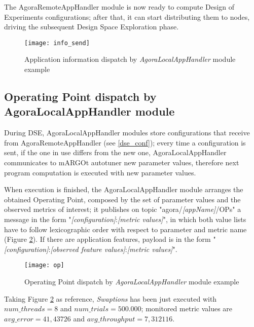 The AgoraRemoteAppHandler module is now ready to compute Design of Experiments configurations; after that, it can start distributing them to nodes, driving the subsequent Design Space Exploration phase.

\begin{figure}[t]

    \centering
    \texttt{[image: info\_send]}
    \caption{Application information dispatch by \textit{AgoraLocalAppHandler} module example}
    \label{fig:info_send}
    
\end{figure}





\subsection{Operating Point dispatch by AgoraLocalAppHandler module}\label{opSend}

During DSE, AgoraLocalAppHandler modules store configurations that receive from AgoraRemoteAppHandler (see \ref{dse_conf}); every time a configuration is sent, if the one in use differs from the new one, AgoraLocalAppHandler communicates to mARGOt autotuner new parameter values, therefore next program computation is executed with new parameter values.

When execution is finished, the AgoraLocalAppHandler module arranges the obtained Operating Point, composed by the set of parameter values and the observed metrics of interest; it publishes on topic "agora/\textit{[appName]}/OPs" a message in the form "\textit{[configuration]}:\textit{[metric values]}", in which both value lists have to follow lexicographic order with respect to parameter and metric name (Figure \ref{fig:op}). If there are application features, payload is in the form "\textit{[configuration]}:\textit{[ob\-served feature values]}:\textit{[metric values]}".

\begin{figure}[htb]

    \centering
    \texttt{[image: op]}
    \caption{Operating Point dispatch by \textit{AgoraLocalAppHandler} module example}
    \label{fig:op}
    
\end{figure}

Taking Figure \ref{fig:op} as reference, \textit{Swaptions} has been just executed with\linebreak $num\_threads = 8$ and $num\_trials = 500.000$; monitored metric values are $avg\_error = 41,43726$ and $avg\_throughput = 7,312116$.

